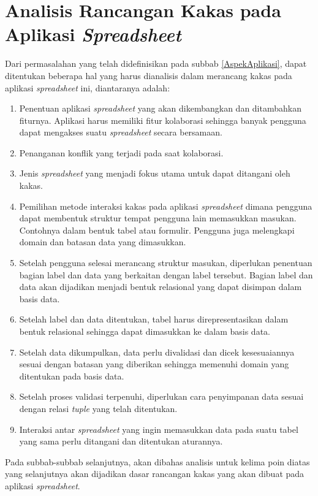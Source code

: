\section{Analisis Rancangan Kakas pada Aplikasi \textit{Spreadsheet}}
Dari permasalahan yang telah didefinisikan pada subbab \ref{AspekAplikasi}, dapat ditentukan beberapa hal yang harus dianalisis dalam merancang kakas pada aplikasi \textit{spreadsheet} ini, diantaranya adalah:
\begin{enumerate}
	\item Penentuan aplikasi \textit{spreadsheet} yang akan dikembangkan dan ditambahkan fiturnya. Aplikasi harus memiliki fitur kolaborasi sehingga banyak pengguna dapat mengakses suatu \textit{spreadsheet} secara bersamaan.
	\item Penanganan konflik yang terjadi pada saat kolaborasi.
	\item Jenis \textit{spreadsheet} yang menjadi fokus utama untuk dapat ditangani oleh kakas.
	\item Pemilihan metode interaksi kakas pada aplikasi \textit{spreadsheet} dimana pengguna dapat membentuk struktur tempat pengguna lain memasukkan masukan. Contohnya dalam bentuk tabel atau formulir. Pengguna juga melengkapi domain dan batasan data yang dimasukkan.
	\item Setelah pengguna selesai merancang struktur masukan, diperlukan penentuan bagian label dan data yang berkaitan dengan label tersebut. Bagian label dan data akan dijadikan menjadi bentuk relasional yang dapat disimpan dalam basis data.
	\item Setelah label dan data ditentukan, tabel harus direpresentasikan dalam bentuk relasional sehingga dapat dimasukkan ke dalam basis data.
	\item Setelah data dikumpulkan, data perlu divalidasi dan dicek kesesuaiannya sesuai dengan batasan yang diberikan sehingga memenuhi domain yang ditentukan pada basis data.
	\item Setelah proses validasi terpenuhi, diperlukan cara penyimpanan data sesuai dengan relasi \textit{tuple} yang telah ditentukan.
	\item Interaksi antar \textit{spreadsheet} yang ingin memasukkan data pada suatu tabel yang sama perlu ditangani dan ditentukan aturannya.
\end{enumerate}
Pada subbab-subbab selanjutnya, akan dibahas analisis untuk kelima poin diatas yang selanjutnya akan dijadikan dasar rancangan kakas yang akan dibuat pada aplikasi \textit{spreadsheet}.

